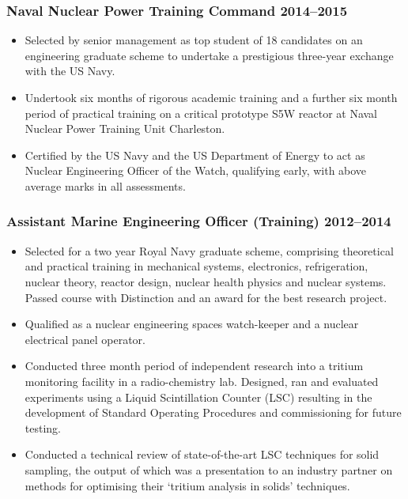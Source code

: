 \documentclass[a4paper, oneside, final, 11pt]{scrartcl} %
\begin{document}
				
\subsubsection*{Naval Nuclear Power Training Command \hfill 2014--2015}  
\normalfont
\begin{itemize}
	\item Selected by senior management as top student of 18 candidates on an engineering graduate scheme to undertake a prestigious three-year exchange with the US Navy. 
	\item Undertook six months of rigorous academic training and a further six month period of practical training on a critical prototype S5W reactor at Naval Nuclear Power Training Unit Charleston.
	\item Certified by the US Navy and the US Department of Energy to act as Nuclear Engineering Officer of the Watch, qualifying early, with above average marks in all assessments.
\end{itemize}

				
\subsubsection*{Assistant Marine Engineering Officer (Training) \hfill 2012--2014}  
\normalfont
\begin{itemize}
	\item Selected for a two year Royal Navy graduate scheme, comprising theoretical and practical training in mechanical systems, electronics, refrigeration, nuclear theory, reactor design, nuclear health physics and nuclear systems. Passed course with Distinction and an award for the best research project. 
	\item Qualified as a nuclear engineering spaces watch-keeper and a nuclear electrical panel operator. 
	\item Conducted  three month period of independent research into a tritium monitoring facility in a radio-chemistry lab. Designed, ran and evaluated experiments using a Liquid Scintillation Counter (LSC) resulting in the development of Standard Operating Procedures and commissioning for future testing. 
	\item Conducted a technical review of state-of-the-art LSC techniques for solid sampling, the output of which was a presentation to an industry partner on methods for optimising their `tritium analysis in solids' techniques.
\end{itemize}
\end{document}

